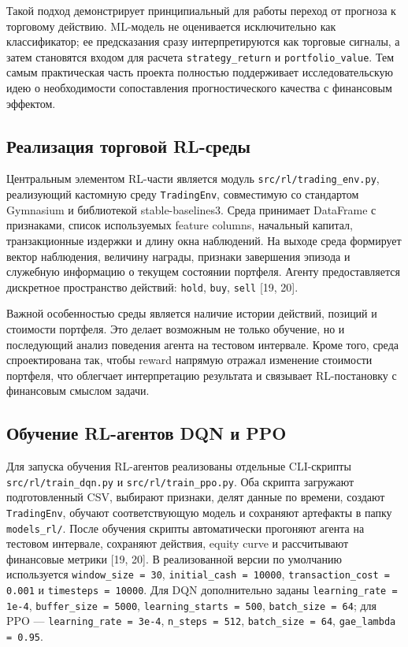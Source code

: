 Такой подход демонстрирует принципиальный для работы переход от прогноза к торговому действию. ML-модель не оценивается исключительно как классификатор; ее предсказания сразу интерпретируются как торговые сигналы, а затем становятся входом для расчета \texttt{strategy\_return} и \texttt{portfolio\_value}. Тем самым практическая часть проекта полностью поддерживает исследовательскую идею о необходимости сопоставления прогностического качества с финансовым эффектом.

\subsection{Реализация торговой RL-среды}

Центральным элементом RL-части является модуль \texttt{src/rl/trading\_env.py}, реализующий кастомную среду \texttt{TradingEnv}, совместимую со стандартом Gymnasium и библиотекой stable-baselines3. Среда принимает DataFrame с признаками, список используемых feature columns, начальный капитал, транзакционные издержки и длину окна наблюдений. На выходе среда формирует вектор наблюдения, величину награды, признаки завершения эпизода и служебную информацию о текущем состоянии портфеля. Агенту предоставляется дискретное пространство действий: \texttt{hold}, \texttt{buy}, \texttt{sell} [19, 20].

Важной особенностью среды является наличие истории действий, позиций и стоимости портфеля. Это делает возможным не только обучение, но и последующий анализ поведения агента на тестовом интервале. Кроме того, среда спроектирована так, чтобы reward напрямую отражал изменение стоимости портфеля, что облегчает интерпретацию результата и связывает RL-постановку с финансовым смыслом задачи.

\subsection{Обучение RL-агентов DQN и PPO}

Для запуска обучения RL-агентов реализованы отдельные CLI-скрипты \texttt{src/rl/train\_dqn.py} и \texttt{src/rl/train\_ppo.py}. Оба скрипта загружают подготовленный CSV, выбирают признаки, делят данные по времени, создают \texttt{TradingEnv}, обучают соответствующую модель и сохраняют артефакты в папку \texttt{models\_rl/}. После обучения скрипты автоматически прогоняют агента на тестовом интервале, сохраняют действия, equity curve и рассчитывают финансовые метрики [19, 20]. В реализованной версии по умолчанию используется \texttt{window\_size = 30}, \texttt{initial\_cash = 10000}, \texttt{transaction\_cost = 0.001} и \texttt{timesteps = 10000}. Для DQN дополнительно заданы \texttt{learning\_rate = 1e-4}, \texttt{buffer\_size = 5000}, \texttt{learning\_starts = 500}, \texttt{batch\_size = 64}; для PPO --- \texttt{learning\_rate = 3e-4}, \texttt{n\_steps = 512}, \texttt{batch\_size = 64}, \texttt{gae\_lambda = 0.95}.

